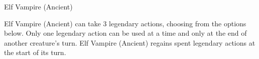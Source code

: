 \documentclass[10pt,a4paper,twoside,twocolumn,openany,bg=print,nodeprecatedcode]{dndbook}
\begin{document}
\begin{DndMonster}[float*=t]{Elf Vampire (Ancient)}
\par
{}
Elf Vampire (Ancient) can take 3 legendary actions, choosing from the options below. Only one legendary action can be used at a time and only at the end of another creature's turn. Elf Vampire (Ancient) regains spent legendary actions at the start of its turn.
\begin{DndMonsterLegendaryActions}
\end{DndMonsterLegendaryActions}
\end{DndMonster}
\end{document}
